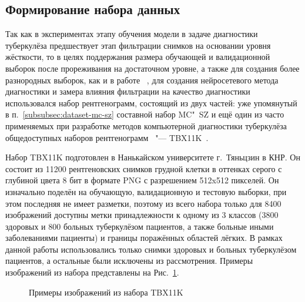 \subsection{Формирование набора данных} \label{subsubsec:dataset-tbx}

Так как в экспериментах этапу обучения модели в задаче диагностики туберкулёза предшествует этап фильтрации снимков на основании уровня жёсткости, то в целях поддержания размера обучающей и валидационной выборок после прореживания на достаточном уровне, а также для создания более разнородных выборок, как и в работе ~\cite{dovganich2022automatic}, для создания нейросетевого метода диагностики и замера влияния фильтрации на качество диагностики использовался набор рентгенограмм, состоящий из двух частей: уже упомянутый в п.~\ref{subsubsec:dataset-mc-sz} составной набор MC"~SZ и ещё один из часто применяемых при разработке методов компьютерной диагностики туберкулёза общедоступных наборов рентгенограмм~\cite{singh2022evolution, santosh2022advances} "--- TBX11K~\cite{liu2020rethinking}.


Набор TBX11K подготовлен в Нанькайском университете г.~Тяньцзин в КНР. Он состоит из 11200 рентгеновских снимков грудной клетки в оттенках серого с глубиной цвета 8 бит в формате PNG с разрешением 512x512 пикселей. Он изначально поделён на обучающую, валидационную и тестовую выборки, при этом последняя не имеет разметки, поэтому из всего набора только для 8400 изображений доступны метки принадлежности к одному из 3 классов (3800 здоровых и 800 больных туберкулёзом пациентов, а также больные иными заболеваниями пациенты) и границы поражённых областей лёгких. В рамках данной работы использовались только снимки здоровых и больных туберкулёзом пациентов, а остальные были исключены из рассмотрения. Примеры изображений из набора представлены на Рис.~\ref{fig:samples-tbx}.

\begin{figure}[ht]
	\caption{Примеры изображений из набора TBX11K}
	\label{fig:samples-tbx}
\end{figure}

